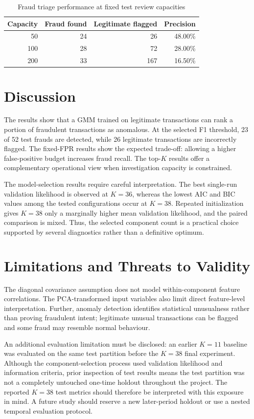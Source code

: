 \documentclass[conference]{IEEEtran}
\begin{document}
\begin{table}[t]
\caption{Fraud triage performance at fixed test review capacities}
\label{tab:topk}
\centering
\small
\begin{tabular}{rrrr}
\toprule
Capacity & Fraud found & Legitimate flagged & Precision\\
\midrule
50 & 24 & 26 & 48.00\%\\
100 & 28 & 72 & 28.00\%\\
200 & 33 & 167 & 16.50\%\\
\bottomrule
\end{tabular}
\end{table}

\section{Discussion}
The results show that a GMM trained on legitimate transactions can rank a portion of fraudulent transactions as anomalous. At the selected F1 threshold, 23 of 52 test frauds are detected, while 26 legitimate transactions are incorrectly flagged. The fixed-FPR results show the expected trade-off: allowing a higher false-positive budget increases fraud recall. The top-$K$ results offer a complementary operational view when investigation capacity is constrained.

The model-selection results require careful interpretation. The best single-run validation likelihood is observed at $K=36$, whereas the lowest AIC and BIC values among the tested configurations occur at $K=38$. Repeated initialization gives $K=38$ only a marginally higher mean validation likelihood, and the paired comparison is mixed. Thus, the selected component count is a practical choice supported by several diagnostics rather than a definitive optimum.

\section{Limitations and Threats to Validity}
The diagonal covariance assumption does not model within-component feature correlations. The PCA-transformed input variables also limit direct feature-level interpretation. Further, anomaly detection identifies statistical unusualness rather than proving fraudulent intent; legitimate unusual transactions can be flagged and some fraud may resemble normal behaviour.

An additional evaluation limitation must be disclosed: an earlier $K=11$ baseline was evaluated on the same test partition before the $K=38$ final experiment. Although the component-selection process used validation likelihood and information criteria, prior inspection of test results means the test partition was not a completely untouched one-time holdout throughout the project. The reported $K=38$ test metrics should therefore be interpreted with this exposure in mind. A future study should reserve a new later-period holdout or use a nested temporal evaluation protocol.
\end{document}
